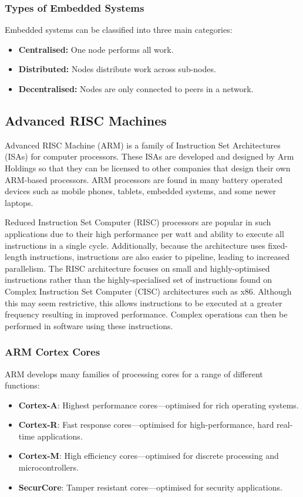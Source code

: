 \documentclass{article}
\begin{document}
\subsubsection{Types of Embedded Systems}
Embedded systems can be classified into three main categories:
\begin{itemize}
    \item \textbf{Centralised:} One node performs all work.
    \item \textbf{Distributed:} Nodes distribute work across sub-nodes.
    \item \textbf{Decentralised:} Nodes are only connected to peers in a network.
\end{itemize}
\subsection{Advanced RISC Machines}
Advanced RISC Machine (ARM) is a family of Instruction Set
Architectures (ISAs) for computer processors. These ISAs are developed
and designed by Arm Holdings so that they can be licensed to other
companies that design their own ARM-based processors. ARM processors
are found in many battery operated devices such as mobile phones,
tablets, embedded systems, and some newer laptops.

Reduced Instruction Set Computer (RISC) processors are popular in such
applications due to their high performance per watt and ability to
execute all instructions in a single cycle. Additionally, because the
architecture uses fixed-length instructions, instructions are also
easier to pipeline, leading to increased parallelism. The RISC
architecture focuses on small and highly-optimised instructions rather
than the highly-specialised set of instructions found on Complex
Instruction Set Computer (CISC) architectures such as x86. Although
this may seem restrictive, this allows instructions to be executed at a
greater frequency resulting in improved performance. Complex operations
can then be performed in software using these instructions.
\subsubsection{ARM Cortex Cores}
ARM develops many families of processing cores for a range of different
functions:
\begin{itemize}
    \item \textbf{Cortex-A}: Highest performance cores---optimised for rich operating systems.
    \item \textbf{Cortex-R}: Fast response cores---optimised for high-performance, hard real-time applications.
    \item \textbf{Cortex-M}: High efficiency cores---optimised for discrete processing and microcontrollers.
    \item \textbf{SecurCore}: Tamper resistant cores---optimised for security applications.
\end{itemize}
\end{document}
